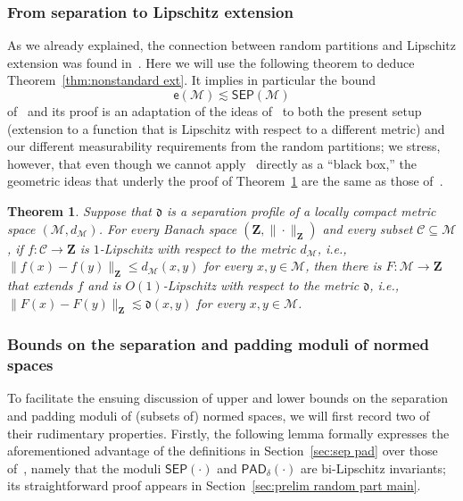\documentclass[11pt,reqno]{amsart}
\renewcommand{\le}{\leqslant}
\renewcommand{\d}{\delta}
\newtheorem{theorem}{Theorem}
\theoremstyle{remark}
\newcommand{\MM}{\mathcal{M}}
\renewcommand{\subset}{\subseteq}
\newcommand{\ee}{\mathsf{e}}
\newcommand{\bfZ}{\mathbf{Z}}
\newcommand{\sub}{\mathscr{C}}
\renewcommand{\1}{\mathbf 1}
\newcommand{\sep}{\mathsf{SEP}}
\newcommand{\pad}{\mathsf{PAD}}
\begin{document}
\subsubsection{From separation to Lipschitz extension} As we already explained, the connection between random partitions and  Lipschitz extension  was found in~\cite{LN05}. Here  we will use the following theorem to deduce Theorem~\ref{thm:nonstandard ext}. It implies in particular the bound
\begin{equation}\label{eq:quote LN}
\ee(\MM)\lesssim \sep(\MM)
\end{equation}
of~\cite{LN05} and its proof is an adaptation of the ideas of~\cite{LN05} to both the present setup (extension to a function that is Lipschitz with respect to a different metric) and our different measurability requirements from the random partitions; we stress, however, that even though we cannot apply~\cite{LN05} directly as a ``black box,'' the geometric ideas that underly the proof of Theorem~\ref{thm:local compact ext} are the same as those of~\cite{LN05}.






\begin{theorem}\label{thm:local compact ext} Suppose that $\mathfrak{d}$ is a separation profile of a locally compact metric space $(\MM,d_\MM)$. For every Banach space $(\bfZ,\|\cdot\|_\bfZ)$ and every subset $\sub\subset \MM$, if $f:\sub\to \bfZ$ is $1$-Lipschitz with respect to the metric $d_\MM$, i.e., $\|f(x)-f(y)\|_\bfZ\le d_\MM(x,y)$ for every $x,y\in \MM$, then there is $F:\MM\to \bfZ$ that extends $f$ and is $O(1)$-Lipschitz with respect to the metric $\mathfrak{d}$, i.e., $\|F(x)-F(y)\|_\bfZ\lesssim \mathfrak{d} (x,y)$ for every $x,y\in \MM$.
\end{theorem}




\subsubsection{Bounds on the separation and padding moduli of normed spaces}\label{sec:pad sep bounds} To facilitate the ensuing discussion of upper and lower bounds on the separation and padding moduli of (subsets of) normed spaces, we will first record two of their rudimentary properties. Firstly, the following lemma formally expresses the aforementioned advantage of the definitions in Section~\ref{sec:sep pad} over those of~\cite{LN05}, namely that the moduli $\sep(\cdot)$ and $\pad_\d(\cdot)$ are bi-Lipschitz invariants; its straightforward proof appears in Section~\ref{sec:prelim random part main}.
\end{document}
